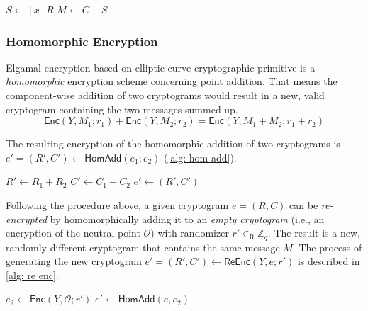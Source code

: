 \begin{algorithm}[ht]
    \DontPrintSemicolon
    \caption{$\mathsf{Dec} (x, e)$}
    \label{alg: dec}
    
    $S \gets [x]R$ \;
    $M \gets C - S$ \;
     
\end{algorithm}


\subsubsection{Homomorphic Encryption}
Elgamal encryption based on elliptic curve cryptographic primitive is a \textit{homomorphic} encryption scheme concerning point addition. That means the component-wise addition of two cryptograms would result in a new, valid cryptogram containing the two messages summed up.
\[
\mathsf{Enc}(Y, M_1; r_1) + \mathsf{Enc}(Y, M_2; r_2) = \mathsf{Enc}(Y, M_1 + M_2; r_1 + r_2)
\]

The resulting encryption of the homomorphic addition of two cryptograms is $e' = (R', C') \gets \mathsf{HomAdd} (e_1; e_2)$ (\cref{alg: hom add}).

\begin{algorithm}[ht]
    \DontPrintSemicolon
    \caption{$\mathsf{HomAdd}(e_1; e_2)$}
    \label{alg: hom add}
    
    $R' \gets R_1 + R_2$ \;
    $C' \gets C_1 + C_2$ \;
    $e' \gets (R', C')$\;
     
\end{algorithm}

Following the procedure above, a given cryptogram $e = (R, C)$ can be \textit{re-encrypted} by homomorphically adding it to an \textit{empty cryptogram} (i.e., an encryption of the neutral point $\mathcal{O}$) with randomizer $r' \in_\mathrm{R} \mathbb{Z}_q$. The result is a new, randomly different cryptogram that contains the same message $M$. The process of generating the new cryptogram $e' = (R', C') \gets \mathsf{ReEnc} (Y, e; r')$ is described in \cref{alg: re enc}.

\begin{algorithm}[ht]
    \DontPrintSemicolon
    \caption{$\mathsf{ReEnc} (Y, e; r')$}
    \label{alg: re enc}
    
    $e_2 \gets \mathsf{Enc}(Y, \mathcal{O}; r')$ 
    $e' \gets \mathsf{HomAdd} (e, e_2)$ 
     
\end{algorithm}

